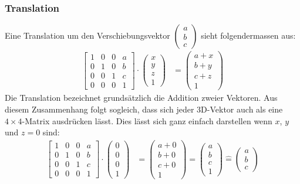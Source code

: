 \documentclass[titlepage, 11pt, a4paper, ngerman]{article}
\begin{document}
\subsubsection{Translation}
Eine Translation um den Verschiebungsvektor $\begin{pmatrix}
    a \\
    b \\
    c
    \end{pmatrix}$ sieht folgendermassen aus:
\begin{align*}
    \begin{bmatrix}
    1 & 0 & 0 & a \\
    0 & 1 & 0 & b \\
    0 & 0 & 1 & c \\
    0 & 0 & 0 & 1
    \end{bmatrix} \cdot
    \begin{pmatrix}
    x \\ y \\ z \\ 1
    \end{pmatrix} &=
    \begin{pmatrix}
    a + x \\
    b + y \\
    c + z \\
    1
    \end{pmatrix}
\end{align*}
\bigbreak
Die Translation bezeichnet grundsätzlich die Addition zweier Vektoren. Aus diesem Zusammenhang folgt sogleich, dass sich jeder 3D-Vektor auch als eine $4\times4$-Matrix ausdrücken lässt. Dies lässt sich ganz einfach darstellen wenn $x$, $y$ und $z = 0$ sind:
\begin{align*}
    \begin{bmatrix}
    1 & 0 & 0 & a \\
    0 & 1 & 0 & b \\
    0 & 0 & 1 & c \\
    0 & 0 & 0 & 1
    \end{bmatrix} \cdot
    \begin{pmatrix}
    0 \\ 0 \\ 0 \\ 1
    \end{pmatrix} &=
    \begin{pmatrix}
    a + 0 \\
    b + 0 \\
    c + 0 \\
    1
    \end{pmatrix} =
    \begin{pmatrix}
    a \\
    b \\
    c \\
    1
    \end{pmatrix} \widehat{=}
    \begin{pmatrix}
    a \\
    b \\
    c
    \end{pmatrix}
\end{align*}
\end{document}
